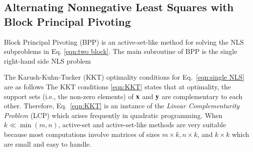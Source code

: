 \subsection{Alternating Nonnegative Least Squares with Block Principal Pivoting}
\label{sec:BPP}


Block Principal Pivoting (BPP) is an active-set-like method for solving the NLS subproblems in Eq. \eqref{eqn:two block}.
The main subroutine of BPP is the single right-hand side NLS problem

The Karush-Kuhn-Tucker (KKT) optimality conditions for  Eq.~\eqref{eqn:single NLS} are as follows
The KKT conditions \eqref{eqn:KKT} states that at optimality, the support sets (i.e., the non-zero elements)
of $\mathbf{x}$ and $\mathbf{y}$ are complementary to each other. Therefore, Eq.~\eqref{eqn:KKT} is an instance of
the \emph{Linear Complementarity Problem} (LCP) which arises frequently in quadratic programming.
When $k\ll\min(m,n)$, active-set and active-set-like methods are very suitable because most
computations involve matrices of sizes $m\times k, n\times k$, and $k\times k$ which are
small and easy to handle.

